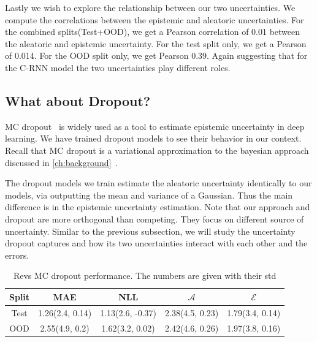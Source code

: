 Lastly we wish to explore the relationship between our two uncertainties. We compute the correlations between the epistemic and aleatoric uncertainties. For the combined splits(Test+OOD), we get a Pearson correlation of 0.01 between the aleatoric and epistemic uncertainty. For the test split only, we get a Pearson of 0.014. For the OOD split only, we get Pearson 0.39. Again suggesting that for the C-RNN model the two uncertainties play different roles. 

\clearpage
\subsection{What about Dropout?}

MC dropout~\citep{gal2016dropout} is widely used as a tool to estimate epistemic uncertainty in deep learning. We have trained dropout models to see their behavior in our context. Recall that MC dropout is a variational approximation to the bayesian approach discussed in \cref{ch:background}~\citep{gal2016dropout}. 

The dropout models we train estimate the aleatoric uncertainty identically to our models, via outputting the mean and variance of a Gaussian. Thus the main difference is in the epistemic uncertainty estimation. Note that our approach and dropout are more orthogonal than competing. They focus on different source of uncertainty. Similar to the previous subsection, we will study the uncertainty dropout captures and how its two uncertainties interact with each other and the errors.

\begin{table}[htbp]
\centering
    \begin{tabular}{c  c  c   c  c }  
        \toprule
        Split & MAE & NLL & $\mathcal{A}$ & $\mathcal{E}$\\
        \midrule
        Test &  1.26(2.4, 0.14) & 1.13(2.6, -0.37) & 2.38(4.5, 0.23) &  1.79(3.4, 0.14) \\
        OOD  &  2.55(4.9, 0.2)&  1.62(3.2, 0.02)& 2.42(4.6, 0.26)&  1.97(3.8, 0.16) \\
        \midrule
    \end{tabular}
    \caption{Revs MC dropout performance. The numbers are given with their std}
    \label{tbl:revs_dropout}
\end{table}


